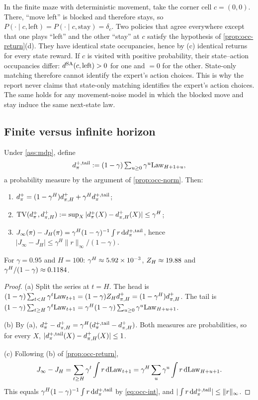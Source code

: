 \begin{example}\label{ex:occ-blocked}
In the finite maze with deterministic movement, take the corner cell $c=(0,0)$.
There, ``move left'' is blocked and therefore stays, so $P(\cdot\mid c,\text{left})=P(\cdot\mid c,\text{stay})=\delta_c$.
Two policies that agree everywhere except that one plays ``left'' and the other ``stay'' at $c$ satisfy the hypothesis of \cref{prop:occ-return}(d).
They have identical state occupancies, hence by (c) identical returns for every state reward.
If $c$ is visited with positive probability, their state--action occupancies differ: $d^{\SA}(c,\text{left})>0$ for one and $=0$ for the other.
State-only matching therefore cannot identify the expert's action choices.
This is why the report never claims that state-only matching identifies the expert's action choices.
The same holds for any movement-noise model in which the blocked move and stay induce the same next-state law.
\end{example}

\subsection{Finite versus infinite horizon}\label{sec:occ-tail}

\begin{proposition}\label{prop:occ-tail}
Under \cref{ass:mdp}, define
\[
d^{+,\tail}_\pi:=(1-\gamma)\textstyle\sum_{u\ge0}\gamma^u\law_{H+1+u},
\]
a probability measure by the argument of \cref{prop:occ-norm}. Then:
\begin{enumerate}[nosep,label=(\alph*)]
\item $d^+_\pi=(1-\gamma^H)d^+_{\pi,H}+\gamma^Hd^{+,\tail}_\pi$;
\item $\TV(d^+_\pi,d^+_{\pi,H}):=\sup_X|d^+_\pi(X)-d^+_{\pi,H}(X)|\le\gamma^H$;
\item $J_\infty(\pi)-J_H(\pi)=\gamma^H(1-\gamma)^{-1}\int r\dd d^{+,\tail}_\pi$, hence $|J_\infty-J_H|\le\gamma^H\|r\|_\infty/(1-\gamma)$.
\end{enumerate}
For $\gamma=0.95$ and $H=100$: $\gamma^H\approx\vn{const.gH}{5.92\times10^{-3}}$, $Z_H\approx\vn{const.ZH}{19.88}$ and $\gamma^H/(1-\gamma)\approx\vn{const.gH_over4}{0.1184}$.
\end{proposition}
\begin{proof}
(a) Split the series at $t=H$.
The head is $(1-\gamma)\sum_{t<H}\gamma^t\law_{t+1}=(1-\gamma)Z_Hd^+_{\pi,H}=(1-\gamma^H)d^+_{\pi,H}$.
The tail is $(1-\gamma)\sum_{t\ge H}\gamma^t\law_{t+1}=\gamma^H(1-\gamma)\sum_{u\ge0}\gamma^u\law_{H+u+1}$.

(b) By (a), $d^+_\pi-d^+_{\pi,H}=\gamma^H(d^{+,\tail}_\pi-d^+_{\pi,H})$.
Both measures are probabilities, so for every $X$, $|d^{+,\tail}_\pi(X)-d^+_{\pi,H}(X)|\le1$.

(c) Following (b) of \cref{prop:occ-return},
\[
J_\infty-J_H=\sum_{t\ge H}\gamma^t\int r\dd\law_{t+1}=\gamma^H\sum_u\gamma^u\int r\dd\law_{H+u+1}.
\]
This equals $\gamma^H(1-\gamma)^{-1}\int r\dd d^{+,\tail}_\pi$ by \eqref{eq:occ-int}, and $|\int r\dd d^{+,\tail}_\pi|\le\|r\|_\infty$.
\end{proof}

